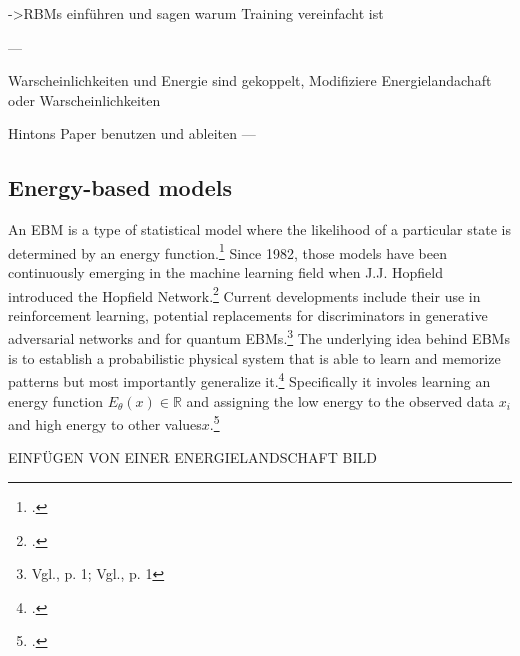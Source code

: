 ->RBMs einführen und sagen warum Training vereinfacht ist

---

Warscheinlichkeiten und Energie sind gekoppelt, Modifiziere Energielandachaft oder Warscheinlichkeiten

Hintons Paper benutzen und ableiten
---

\subsection{Energy-based models}


An \ac{EBM} is a type of statistical model where the likelihood of a particular state is determined by an energy function.\footcite[Vgl.][2]{huembeliPhysicsEnergybasedModels2022}
Since 1982, those models have been continuously emerging in the machine learning field when J.J. Hopfield introduced the Hopfield Network.\footcite[Vgl.][]{hopfieldNeuralNetworksPhysical1982}
Current developments include their use in reinforcement learning, potential replacements for discriminators in generative adversarial networks and for quantum \ac{EBM}s.\footnote{Vgl.\cite{verdonQuantumHamiltonianBasedModels2019}, p. 1; Vgl.\cite{duModelBasedPlanning2021}, p. 1}
The underlying idea behind \ac{EBM}s is to establish a probabilistic physical system that is able to learn and memorize patterns but most importantly generalize it.\footcite[Vgl.][2]{huembeliPhysicsEnergybasedModels2022} 
Specifically it involes learning an energy function \(E_{\theta}(x) \in \mathbb{R}\) and assigning the low energy to the observed data \(x_i\) and high energy to other values\(x\).\footcite[Vgl.][330]{gustafssonEnergyBasedModelsDeep2020}

EINFÜGEN VON EINER ENERGIELANDSCHAFT BILD

